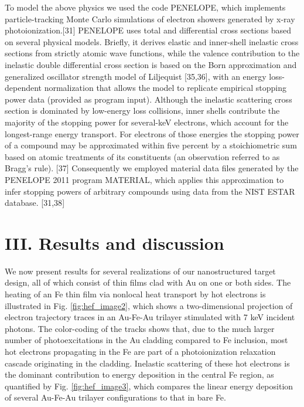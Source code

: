 To model the above physics we used the code PENELOPE, which implements
particle-tracking Monte Carlo simulations of electron showers generated
by x-ray photoionization.{[}31{]} PENELOPE uses total and differential
cross sections based on several physical models. Briefly, it derives
elastic and inner-shell inelastic cross sections from strictly atomic
wave functions, while the valence contribution to the inelastic double
differential cross section is based on the Born approximation and
generalized oscillator strength model of Liljequist {[}35,36{]}, with an
energy loss-dependent normalization that allows the model to replicate
empirical stopping power data (provided as program input). Although the
inelastic scattering cross section is dominated by low-energy loss
collisions, inner shells contribute the majority of the stopping power
for several-keV electrons, which account for the longest-range energy
transport. For electrons of those energies the stopping power of a
compound may be approximated within five percent by a stoichiometric sum
based on atomic treatments of its constituents (an observation referred
to as Bragg's rule). {[}37{]} Consequently we employed material data
files generated by the PENELOPE 2011 program MATERIAL, which applies
this approximation to infer stopping powers of arbitrary compounds using
data from the NIST ESTAR database. {[}31,38{]}

\section{III. Results and discussion}

We now present results for several realizations of our nanostructured
target design, all of which consist of thin films clad with Au on one or
both sides. The heating of an Fe thin film via nonlocal heat transport
by hot electrons is illustrated in Fig. \ref{fig:hef_image2}, which shows a two-dimensional
projection of electron trajectory traces in an Au-Fe-Au trilayer
stimulated with 7 keV incident photons. The color-coding of the tracks
shows that, due to the much larger number of photoexcitations in the Au
cladding compared to Fe inclusion, most hot electrons propagating in the
Fe are part of a photoionization relaxation cascade originating in the
cladding. Inelastic scattering of these hot electrons is the dominant
contribution to energy deposition in the central Fe region, as
quantified by Fig. \ref{fig:hef_image3}, which compares the linear energy deposition of
several Au-Fe-Au trilayer configurations to that in bare Fe.

